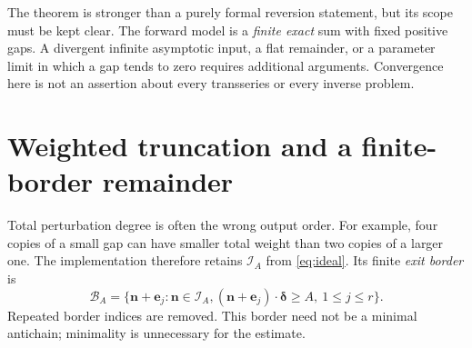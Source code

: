 \documentclass[11pt,a4paper]{article}
\numberwithin{equation}{section}
\theoremstyle{definition}
\newcommand{\nn}{\boldsymbol n}
\newcommand{\ee}{\boldsymbol e}
\newcommand{\del}{\boldsymbol\delta}
\newcommand{\IA}{\mathcal I_A}
\newcommand{\BA}{\mathcal B_A}
\begin{document}
The theorem is stronger than a purely formal reversion statement, but its
scope must be kept clear. The forward model is a \emph{finite exact} sum
with fixed positive gaps. A divergent infinite asymptotic input, a flat
remainder, or a parameter limit in which a gap tends to zero requires
additional arguments. Convergence here is not an assertion about every
transseries or every inverse problem.

\section{Weighted truncation and a finite-border remainder}
\label{sec:remainder}

Total perturbation degree is often the wrong output order. For example,
four copies of a small gap can have smaller total weight than two copies
of a larger one. The implementation therefore retains $\IA$ from
\eqref{eq:ideal}. Its finite \emph{exit border} is
\begin{equation}\label{eq:border}
 \BA=\{\nn+\ee_j:\nn\in\IA,
                  (\nn+\ee_j)\cdot\del\ge A,\ 1\le j\le r\}.
\end{equation}
Repeated border indices are removed. This border need not be a minimal
antichain; minimality is unnecessary for the estimate.
\end{document}
